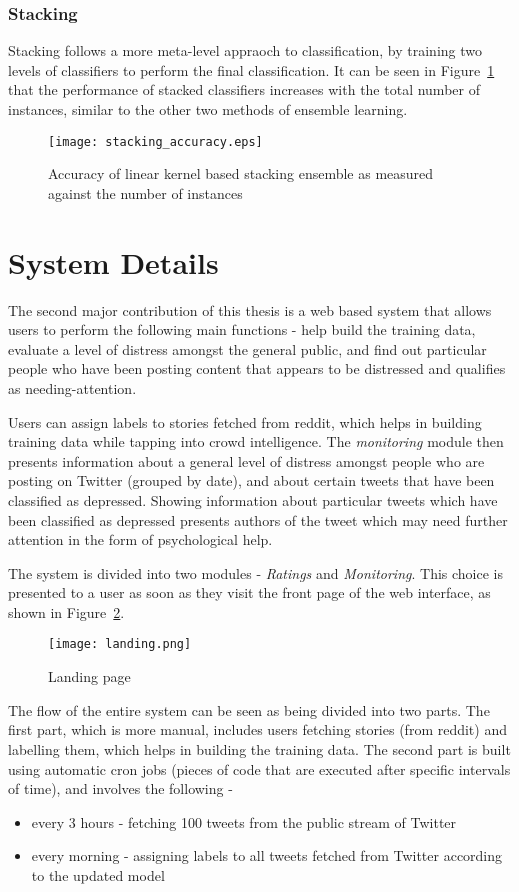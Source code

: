 \subsubsection{Stacking}
Stacking follows a more meta-level appraoch to classification, by training two levels of classifiers to perform the final classification. It can be seen in Figure~\ref{stacking_accuracy} that the performance of stacked classifiers increases with the total number of instances, similar to the other two methods of ensemble learning.
\begin{figure}
    \centering
    \texttt{[image: stacking\_accuracy.eps]}
    \caption{Accuracy of linear kernel based stacking ensemble as measured against the number of instances}
    \label{stacking_accuracy}
\end{figure}

\section{System Details}
\label{section:system_details}

The second major contribution of this thesis is a web based system that allows users to perform the following main functions - help build the training data, evaluate a level of distress amongst the general public, and find out particular people who have been posting content that appears to be distressed and qualifies as needing-attention.

Users can assign labels to stories fetched from reddit, which helps in building training data while tapping into crowd intelligence. The \emph{monitoring} module then presents information about a general level of distress amongst people who are posting on Twitter (grouped by date), and about certain tweets that have been classified as depressed. Showing information about particular tweets which have been classified as depressed presents authors of the tweet which may need further attention in the form of psychological help.

The system is divided into two modules - \emph{Ratings} and \emph{Monitoring}. This choice is presented to a user as soon as they visit the front page of the web interface, as shown in Figure~\ref{landing}.
\begin{figure}
    \centering
    \texttt{[image: landing.png]}
    \caption{Landing page}
    \label{landing}
\end{figure}

The flow of the entire system can be seen as being divided into two parts. The first part, which is more manual, includes users fetching stories (from reddit) and labelling them, which helps in building the training data. The second part is built using automatic cron jobs (pieces of code that are executed after specific intervals of time), and involves the following -
\begin{itemize}
    \item{every 3 hours - fetching 100 tweets from the public stream of Twitter}
    \item{every morning - assigning labels to all tweets fetched from Twitter according to the updated model}
\end{itemize}

